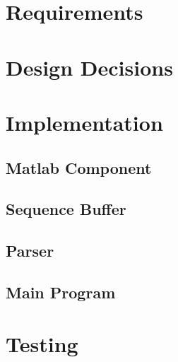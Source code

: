 
\chapter{Requirements}


\chapter{Design Decisions}

\chapter{Implementation}
\section{Matlab Component}
\section{Sequence Buffer}
\section{Parser}
\section{Main Program}
\chapter{Testing}


 